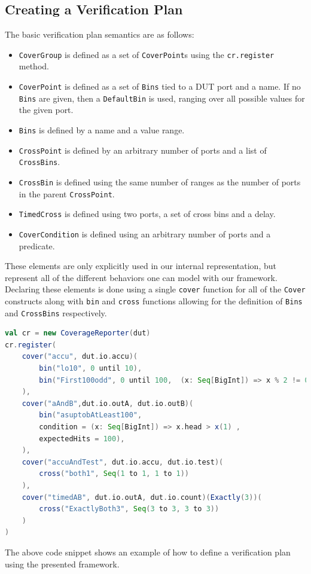 \documentclass[conference]{IEEEtran}
\begin{document}
\subsection{Creating a Verification Plan}
The basic verification plan semantics are as follows:
\begin{itemize}
    \item \texttt{CoverGroup} is defined as a set of \texttt{CoverPoint}s using the \texttt{cr.register} method.
    \item \texttt{CoverPoint} is defined as a set of \texttt{Bins} tied to a DUT port and a name. If no \texttt{Bins} are given, then a \texttt{DefaultBin} is used, ranging over all possible values for the given port.
    \item \texttt{Bins} is defined by a name and a value range.
    \item \texttt{CrossPoint} is defined by an arbitrary number of ports and a list of \texttt{CrossBins}.
    \item \texttt{CrossBin} is defined using the same number of ranges as the number of ports in the parent \texttt{CrossPoint}.
    \item \texttt{TimedCross} is defined using two ports, a set of cross bins and a delay.
    \item \texttt{CoverCondition} is defined using an arbitrary number of ports and a predicate.
\end{itemize}
These elements are only explicitly used in our internal representation, but represent all of the different behaviors one can model with our framework. 
Declaring these elements is done using a single \texttt{cover} function for all of the \texttt{Cover} constructs along with \texttt{bin} and \texttt{cross} functions allowing for the definition of \texttt{Bins} and \texttt{CrossBins} respectively.
\begin{lstlisting}[language=scala]
val cr = new CoverageReporter(dut)
cr.register(
    cover("accu", dut.io.accu)(
        bin("lo10", 0 until 10),
        bin("First100odd", 0 until 100,  (x: Seq[BigInt]) => x % 2 != 0)
    ),
    cover("aAndB",dut.io.outA, dut.io.outB)(
        bin("asuptobAtLeast100", 
        condition = (x: Seq[BigInt]) => x.head > x(1) , 
        expectedHits = 100),
    ),
    cover("accuAndTest", dut.io.accu, dut.io.test)(
        cross("both1", Seq(1 to 1, 1 to 1))
    ),
    cover("timedAB", dut.io.outA, dut.io.count)(Exactly(3))(
        cross("ExactlyBoth3", Seq(3 to 3, 3 to 3))
    ) 
)
\end{lstlisting}
The above code snippet shows an example of how to define a verification plan using the presented framework.
\end{document}
